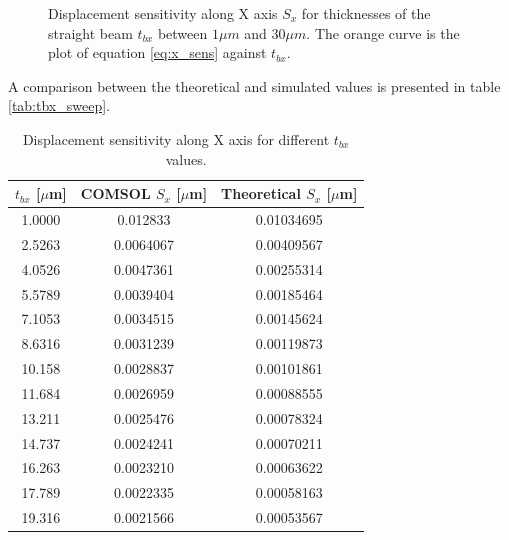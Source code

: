 \documentclass[lettersize,journal]{IEEEtran}
\begin{document}
    \begin{figure}[!h]
        \centering
        
        \caption{Displacement sensitivity along X axis \(S_x\) for thicknesses of the straight beam \(t_{bx}\) between \(1\mu m\) and \(30\mu m\). The orange curve is the plot of equation \ref{eq:x_sens} against \(t_{bx}\).}
        \label{plt:tbx_sweep}
    \end{figure}
    
    A comparison between the theoretical and simulated values is presented in table \ref{tab:tbx_sweep}.
    
    \begin{table}[h]
        \caption{Displacement sensitivity along X axis for different \(t_{bx}\) values.}
        \renewcommand{\arraystretch}{1.2}
        \centering
        \begin{tabular}{|c|c|c|}
            \hline
            \textbf{\(t_{bx}\) [\(\mu\)m]} & \textbf{COMSOL \(S_x\) [\(\mu\)m]} & \textbf{Theoretical \(S_x\) [\(\mu\)m]}\\ \hline
            1.0000       & 0.012833      & 0.01034695                \\ \hline
            2.5263       & 0.0064067     & 0.00409567                \\ \hline
            4.0526       & 0.0047361     & 0.00255314                \\ \hline
            5.5789       & 0.0039404     & 0.00185464                \\ \hline
            7.1053       & 0.0034515     & 0.00145624                \\ \hline
            8.6316       & 0.0031239     & 0.00119873               \\ \hline
            10.158       & 0.0028837     & 0.00101861                \\ \hline
            11.684       & 0.0026959     & 0.00088555                \\ \hline
            13.211       & 0.0025476     & 0.00078324                \\ \hline
            14.737       & 0.0024241     & 0.00070211                \\ \hline
            16.263       & 0.0023210     & 0.00063622                \\ \hline
            17.789       & 0.0022335     & 0.00058163               \\ \hline
            19.316       & 0.0021566     & 0.00053567                \\ \hline

\end{tabular}
\end{table}
\end{document}
